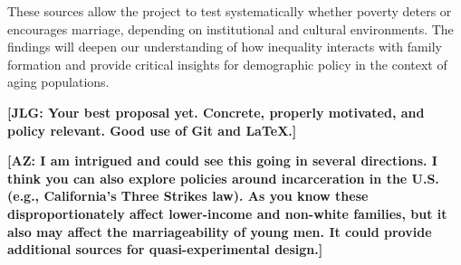These sources allow the project to test systematically whether poverty deters or encourages marriage, depending on institutional and cultural environments. The findings will deepen our understanding of how inequality interacts with family formation and provide critical insights for demographic policy in the context of aging populations.

\bigskip 

\noindent \textbf{[JLG: Your best proposal yet. Concrete, properly motivated, and policy relevant. Good use of Git and \LaTeX.]}

\vspace{3em}

\noindent \textbf{[AZ: I am intrigued and could see this going in several directions. I think you can also explore policies around incarceration in the U.S. (e.g., California's Three Strikes law). As you know these disproportionately affect lower-income and non-white families, but it also may affect the marriageability of young men. It could provide additional sources for quasi-experimental design.]}

\newpage






